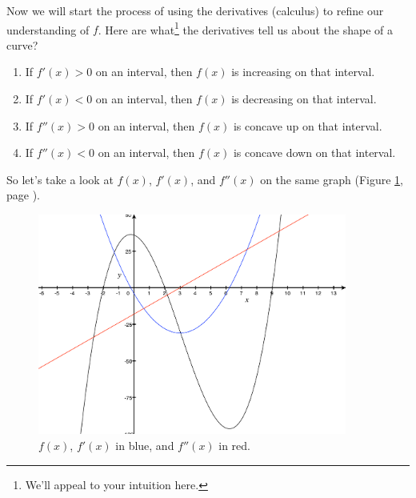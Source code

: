 \documentclass[12pt,addpoints, answers, fleqn]{exam}
\begin{document}
Now we will start the process of using the derivatives (calculus) to refine our understanding of $f$. Here are what\footnote{We'll appeal to your intuition here.} the derivatives tell us about the shape of a curve?
\begin{enumerate}
\item If $f'\left(x \right) > 0$ on an interval, then $f\left(x \right)$ is increasing on that interval.
\item If $f'\left(x \right) <0$ on an interval, then $f\left(x \right)$ is decreasing on that interval.
\item If $f''\left(x \right) > 0$ on an interval, then $f\left(x \right)$ is concave up on that interval.
\item If $f''\left(x \right) < 0 $ on an interval, then $f\left(x \right)$ is concave down on that interval.
\end{enumerate}
So let's take a look at $f\left(x \right)$, $f'\left(x \right)$, and $f''\left(x \right)$ on the same graph (Figure \ref{fig:graph2102}, page \pageref{fig:graph2102}).
\begin{figure}[htbp] %
   \centering
   \includegraphics[width=4in]{./graphics/graph2102.pdf} 
   \caption{$f\left(x \right)$, $f'\left(x \right)$ in blue, and $f''\left(x \right)$ in red.}
   \label{fig:graph2102}
\end{figure}
\end{document}
